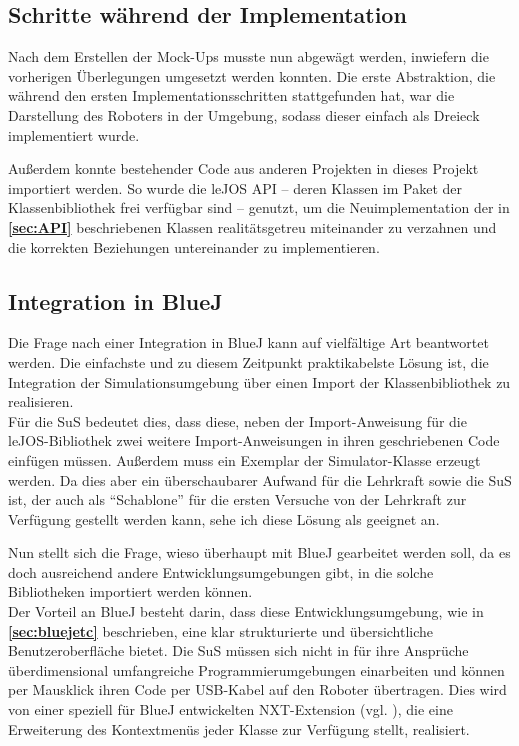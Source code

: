 \documentclass[paper=a4, DIV=calc, BCOR=15mm, twoside=on, onecolumn=on, open = right, titlepage =on, parskip =half, headsepline = on, footsepline = on, chapterprefix = off, appendixprefix = off, fontsize = 12pt, numbers = noenddot, abstract = on]{scrbook}
\begin{document}
\par \singlespacing
\subsection{Schritte während der Implementation}
\onehalfspacing
Nach dem Erstellen der Mock-Ups musste nun abgewägt werden, inwiefern die vorherigen Überlegungen umgesetzt werden konnten. Die erste Abstraktion, die während den ersten Implementationsschritten stattgefunden hat, war die Darstellung des Roboters in der Umgebung, sodass dieser einfach als Dreieck implementiert wurde. 

Außerdem konnte bestehender Code aus anderen Projekten in dieses Projekt importiert werden. So wurde die leJOS API -- deren Klassen im Paket der Klassenbibliothek frei verfügbar sind -- genutzt, um die Neuimplementation der in \textbf{\ref{sec:API}} beschriebenen Klassen realitätsgetreu miteinander zu verzahnen und die korrekten Beziehungen untereinander zu implementieren.

\par \singlespacing
\subsection{Integration in BlueJ}
\label{sec:integration}
\onehalfspacing
Die Frage nach einer Integration in BlueJ kann auf vielfältige Art beantwortet werden. Die einfachste und zu diesem Zeitpunkt praktikabelste Lösung ist, die Integration der Simulationsumgebung über einen Import der Klassenbibliothek zu realisieren.\\
Für die SuS bedeutet dies, dass diese, neben der Import-Anweisung für die leJOS-Bibliothek zwei weitere Import-Anweisungen in ihren geschriebenen Code einfügen müssen. Außerdem muss ein Exemplar der Simulator-Klasse erzeugt werden. Da dies aber ein überschaubarer Aufwand für die Lehrkraft sowie die SuS ist, der auch als "`Schablone"' für die ersten Versuche von der Lehrkraft zur Verfügung gestellt werden kann, sehe ich diese Lösung als geeignet an.

Nun stellt sich die Frage, wieso überhaupt mit BlueJ gearbeitet werden soll, da es doch ausreichend andere Entwicklungsumgebungen gibt, in die solche Bibliotheken importiert werden können.\\
Der Vorteil an BlueJ besteht darin, dass diese Entwicklungsumgebung, wie in \textbf{\ref{sec:bluejetc}} beschrieben, eine klar strukturierte und übersichtliche Benutzeroberfläche bietet. Die SuS müssen sich nicht in für ihre Ansprüche überdimensional umfangreiche Programmierumgebungen einarbeiten und können per Mausklick ihren Code per USB-Kabel auf den Roboter übertragen. Dies wird von einer speziell für BlueJ entwickelten NXT-Extension  (vgl. \cite{bowes:12}), die eine Erweiterung des Kontextmenüs jeder Klasse zur Verfügung stellt, realisiert.
\end{document}
